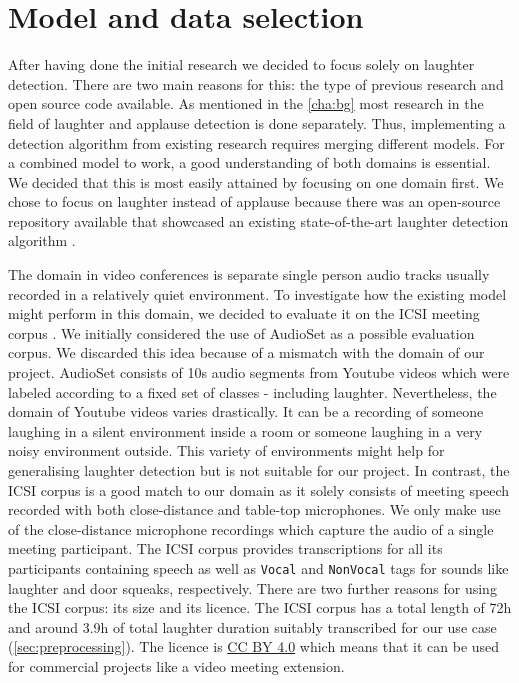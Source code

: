 \documentclass[bsc,frontabs,parskip,deptreport]{infthesis}
\begin{document}
\section{Model and data selection}\label{sec:model-and-data}
After having done the initial research we decided to focus solely on laughter detection. 
There are two main reasons for this: the type of previous research and open source code available.  
As mentioned in the \autoref{cha:bg} most research in the field of laughter and applause detection is done separately. 
Thus, implementing a detection algorithm from existing research requires merging different models. 
For a combined model to work, a good understanding of both domains is essential.
We decided that this is most easily attained by focusing on one domain first. 
We chose to focus on laughter instead of applause because there was an open-source repository available that showcased an existing state-of-the-art laughter detection algorithm \citep{gillick-codebase}.

The domain in video conferences is separate single person audio tracks usually recorded in a relatively quiet environment.
To investigate how the existing model might perform in this domain, we decided to evaluate it on the ICSI meeting corpus \citep{morgan2001meeting}. 
We initially considered the use of AudioSet \citep{googleaudioset} as a possible evaluation corpus. We discarded this idea because of a mismatch with the domain of our project. AudioSet  consists of 10s audio segments from Youtube videos which were labeled according to a fixed set of classes - including laughter. Nevertheless, the domain of Youtube videos varies drastically. It can be a recording of someone laughing in a silent environment inside a room or someone laughing in a very noisy environment outside. This variety of environments might help for generalising laughter detection but is not suitable for our project.
In contrast, the ICSI corpus is a good match to our domain as it solely consists of meeting speech recorded with both close-distance and table-top microphones. 
We only make use of the close-distance microphone recordings which capture the audio of a single meeting participant.
The ICSI corpus provides transcriptions for all its participants containing speech as well as \texttt{Vocal} and \texttt{NonVocal} tags for sounds like laughter and door squeaks, respectively.
There are two further reasons for using the ICSI corpus: its size and its licence.
The ICSI corpus has a total length of 72h and around 3.9h of total laughter duration suitably transcribed for our use case (\autoref{sec:preprocessing}).
The licence is \href{https://creativecommons.org/licenses/by/4.0/legalcode}{CC BY 4.0} which means that it can be used for commercial projects like a video meeting extension.
\end{document}
